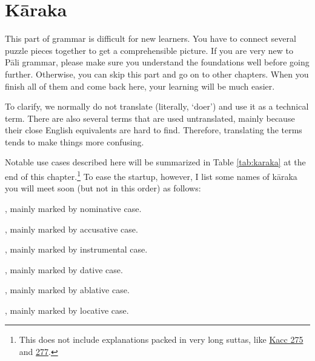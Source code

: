 \chapter{Kāraka}

This part of grammar is difficult for new learners. You have to connect several puzzle pieces together to get a comprehensible picture. If you are very new to Pāli grammar, please make sure you understand the foundations well before going further. Otherwise, you can skip this part and go on to other chapters. When you finish all of them and come back here, your learning will be much easier.

To clarify, we normally do not translate  (literally, `doer') and use it as a technical term. There are also several terms that are used untranslated, mainly because their close English equivalents are hard to find. Therefore, translating the terms tends to make things more confusing.

Notable use cases described here will be summarized in Table \ref{tab:karaka} at the end of this chapter.\footnote{This does not include explanations packed in very long suttas, like \hyperref[sut:275]{Kacc 275} and \hyperref[sut:277]{277}.} To ease the startup, however, I list some names of kāraka you will meet soon (but not in this order) as follows:

\begin{compactitem}
\item {}, mainly marked by nominative case.
\item {}, mainly marked by accusative case.
\item {}, mainly marked by instrumental case.
\item {}, mainly marked by dative case.
\item {}, mainly marked by ablative case.
\item {}, mainly marked by locative case.
\end{compactitem}


